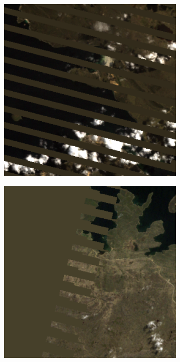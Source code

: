 \documentclass{article}
\begin{document}
\begin{figure}[htbp] %
  \centering %
  \begin{subfigure}[b]{0.3\textwidth} %
      \includegraphics[width=\textwidth]{slc_image1.png} %
      \label{fig:slc1}
  \end{subfigure}
  \hfill %
  \begin{subfigure}[b]{0.3\textwidth}
      \includegraphics[width=\textwidth]{slc_image2.png} %

\end{subfigure}
\end{figure}
\end{document}
